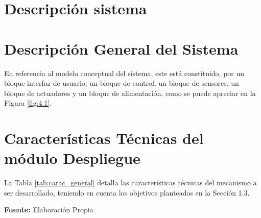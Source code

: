 \section{Descripci\'on  sistema }
\section[Descripción General del Sistema]{Descripción General del Sistema}
En referencia al modelo conceptual del sistema, este está constituido, por un bloque interfaz de usuario, un bloque de control, un bloque de sensores, un bloque de actuadores y un bloque de alimentaci\'on,  como se puede apreciar en la Figura \ref{fig:4.1}.
\section[Características Técnicas de los módulos]{Características Técnicas del módulo Despliegue}
La Tabla \ref{tab:carac_general} detalla las características técnicas del mecanismo a ser desarrollado, teniendo en cuenta los objetivos planteados en la Sección 1.3.
\begin{table}[H]
\protect\caption[Datos T\'ecnicos]{Datos T\'ecnicos. \label{tab:carac_general}}
    \centering
    \vspace{5mm}
    \newline
    \hfill \textbf{Fuente:} Elaboraci\'on Propia
\end{table}

